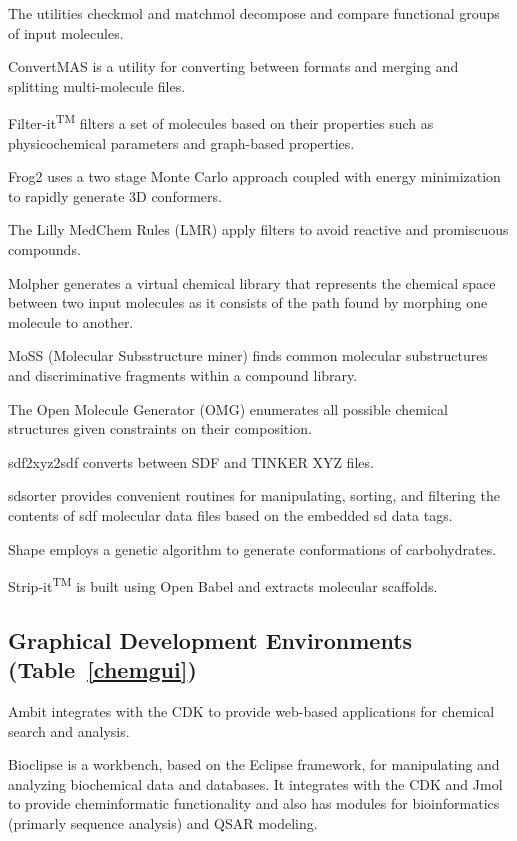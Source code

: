 The utilities checkmol and matchmol \cite{Haider_2010} decompose and compare functional groups of input molecules.

ConvertMAS is a utility for converting between formats and merging and splitting multi-molecule files.

Filter-it\textsuperscript{TM} filters a set of molecules based on their properties such as physicochemical parameters and graph-based properties. 

Frog2 \cite{Miteva_2010} uses a two stage Monte Carlo approach coupled with energy minimization to rapidly generate 3D conformers.

The Lilly MedChem Rules (LMR)  \cite{Bruns_2012} apply filters to avoid reactive and promiscuous compounds.

Molpher  \cite{Hoksza_2014} generates a virtual chemical library that represents the chemical space between two input molecules as it consists of the path found by morphing one molecule to another.

MoSS (Molecular Subsstructure miner) \cite{Borgelt_2005} finds common molecular substructures and discriminative fragments within a compound library.

The Open Molecule Generator (OMG) \cite{Peironcely_2012} enumerates all possible chemical structures given constraints on their composition.

sdf2xyz2sdf  \cite{Tosco_2011} converts between SDF and TINKER XYZ files.

sdsorter provides convenient routines for manipulating, sorting, and filtering the contents of sdf molecular data files based on the embedded sd data tags.

Shape \cite{Rosen_2009} employs a genetic algorithm to generate conformations of carbohydrates.

Strip-it\textsuperscript{TM} is built using Open Babel and extracts molecular scaffolds. 


\subsection*{Graphical Development Environments (Table~\ref{chemgui})} 

Ambit \cite{Jeliazkova_2011} integrates with the CDK to provide web-based applications for chemical search and analysis.

Bioclipse  \cite{Spjuth_2009} is a workbench, based on the Eclipse framework, for manipulating and analyzing biochemical data and databases. It integrates with the CDK and Jmol to provide cheminformatic functionality and also has modules for bioinformatics (primarly sequence analysis) and QSAR modeling.

